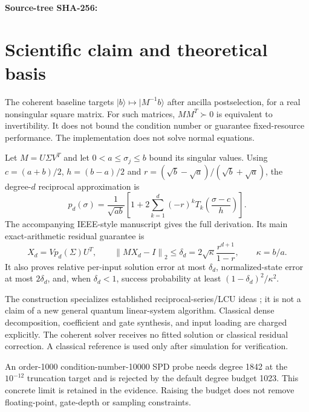 \documentclass[11pt,a4paper]{article}
\newcommand{\norm}[1]{\left\lVert#1\right\rVert}
\begin{document}
\textbf{Source-tree SHA-256:}
\begin{quote}\small\ttfamily\raggedright
\SourceFingerprint
\end{quote}

\section{Scientific claim and theoretical basis}
The coherent baseline targets $\lvert b\rangle\mapsto
\lvert M^{-1}b\rangle$ after ancilla postselection, for a real nonsingular
square matrix. For such matrices, $MM^T\succ0$ is equivalent to invertibility.
It does not bound the condition number or guarantee fixed-resource
performance. The implementation does not solve normal equations.

Let $M=U\Sigma V^T$ and let $0<a\leq\sigma_j\leq b$ bound its singular values.
Using $c=(a+b)/2$, $h=(b-a)/2$ and
$r=(\sqrt b-\sqrt a)/(\sqrt b+\sqrt a)$, the degree-$d$ reciprocal approximation is
\[
 p_d(\sigma)=\frac{1}{\sqrt{ab}}
 \left[1+2\sum_{k=1}^d(-r)^kT_k\!\left(\frac{\sigma-c}{h}\right)\right].
\]
The accompanying IEEE-style manuscript gives the full derivation. Its main
exact-arithmetic residual guarantee is
\[
 X_d=Vp_d(\Sigma)U^T,\qquad
 \norm{MX_d-I}_2\leq\delta_d
 =2\sqrt\kappa\frac{r^{d+1}}{1-r},\qquad \kappa=b/a.
\]
It also proves relative per-input solution error at most $\delta_d$,
normalized-state error at most $2\delta_d$, and, when $\delta_d<1$,
success probability at least $(1-\delta_d)^2/\kappa^2$.

The construction specializes established reciprocal-series/LCU ideas
\cite{harrow2009,childs2017,gilyen2019}; it is not a claim of a new general
quantum linear-system algorithm. Classical dense decomposition, coefficient
and gate synthesis, and input loading are charged explicitly. The coherent
solver receives no fitted solution or classical residual correction. A
classical reference is used only after simulation for verification.

An order-1000 condition-number-10000 SPD probe needs degree 1842 at the
$10^{-12}$ truncation target and is rejected by the default degree budget
1023. This concrete limit is retained in the evidence. Raising the budget
does not remove floating-point, gate-depth or sampling constraints.
\end{document}
